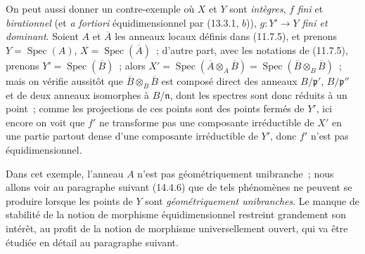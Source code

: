 \begin{remark}[13.3.9]
On peut aussi donner un contre-exemple où $X$ et $Y$ sont \emph{intègres}, $f$
\emph{fini} et \emph{birationnel} (et \emph{a fortiori} équidimensionnel par
(13.3.1, $b$)), $g:Y'\to Y$ \emph{fini et dominant}. Soient $A$ et
$\overline A$ les anneaux locaux définis dans (11.7.5), et prenons
$Y=\operatorname{Spec}(A)$, $X=\operatorname{Spec}(\overline A)$~; d'autre
part, avec les notations de (11.7.5), prenons
$Y'=\operatorname{Spec}(\overline B)$~; alors
$X'=\operatorname{Spec}(\overline A\otimes_A\overline B)
=\operatorname{Spec}(\overline B\otimes_B\overline B)$~; mais on vérifie
aussitôt que $\overline B\otimes_B\overline B$ est composé direct des anneaux
$B/\mathfrak p'$, $B/\mathfrak p''$ et de deux anneaux isomorphes à
$B/\mathfrak n$, dont les spectres sont donc réduits à un point~; comme les
projections de ces points sont des points fermés de $Y'$, ici encore on voit
que $f'$ ne transforme pas une composante irréductible de $X'$ en une partie
partout dense d'une composante irréductible de $Y'$, donc $f'$ n'est pas
équidimensionnel.

Dans cet exemple, l'anneau $A$ n'est pas géométriquement unibranche~; nous
allons voir au paragraphe suivant (14.4.6) que de tels phénomènes ne peuvent se
produire lorsque les points de $Y$ sont \emph{géométriquement unibranches}. Le
manque de stabilité de la notion de morphisme équidimensionnel restreint
grandement son intérêt, au profit de la notion de morphisme universellement
ouvert, qui va être étudiée en détail au paragraphe suivant.
\end{remark}


